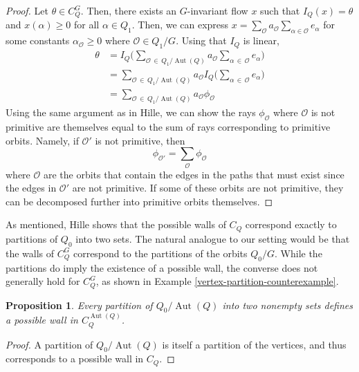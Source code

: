 \documentclass[12pt]{amsart}
\theoremstyle{plain}
\newtheorem{proposition}[theorem]{Proposition}
\theoremstyle{definition}
\DeclareMathOperator{\aut}{Aut}
\begin{document}
\begin{proof}  
    Let $\theta \in C_Q^G$. Then, there exists an $G$-invariant flow $x$ such that $I_Q(x) = \theta$ and $x(\alpha) \geq 0$ for all $\alpha \in Q_1$. Then, we can express $x = \sum_{\mathcal{O}} a_\mathcal{O} \sum_{\alpha \in \mathcal{O}} e_\alpha$ for some constants $\alpha_\mathcal{O} \geq 0$ where $\mathcal{O} \in Q_1/G$. Using that $I_Q$ is linear,
    \begin{align*}
    \theta &= I_Q\Big(\sum_{\mathcal{O} \,\in\, Q_1/\aut(Q)}a_{\mathcal{O}} \sum_{\alpha \,\in\, \mathcal{O}} e_\alpha \Big) \\ 
    &= \sum_{\mathcal{O} \,\in\, Q_1/\aut(Q)}a_{\mathcal{O}} I_Q\Big(\sum_{\alpha \,\in\, \mathcal{O}} e_\alpha \Big) \\
    &= \sum_{\mathcal{O} \,\in\, Q_1/\aut(Q)} a_\mathcal{O}\phi_\mathcal{O}
    \end{align*}
    Using the same argument as in Hille, we can show the rays $\phi_\mathcal{O}$ where $\mathcal{O}$ is not primitive  are themselves equal to the sum of rays corresponding to primitive orbits. Namely, if $\mathcal{O}'$ is not primitive, then
    \[
    \phi_{\mathcal{O}'} = \sum_{\mathcal{O} }\phi_\mathcal{O}
    \]
    where $\mathcal{O}$ are the orbits that contain the edges in the paths that must exist since the edges in $\mathcal{O}'$ are not primitive. If some of these orbits are not primitive, they can be decomposed further into primitive orbits themselves.
\end{proof}

As mentioned, Hille shows that the possible walls of $C_Q$ correspond exactly to partitions of $Q_0$ into two sets. The natural analogue to our setting would be that the walls of $C_Q^G$ correspond to the partitions of the orbits $Q_0/G$. While the partitions do imply the existence of a possible wall, the converse does not generally hold for $C_Q^G$, as shown in Example \ref{vertex-partition-counterexample}.

\begin{proposition} \label{wall-orbit-partition}
    Every partition of $Q_0 / \aut(Q)$ into two nonempty sets defines a possible wall in $C_Q^{\aut(Q)}$.
\end{proposition}

\begin{proof}
    A partition of $Q_0 / \aut(Q)$ is itself a partition of the vertices, and thus corresponds to a possible wall in $C_Q$.
\end{proof}
\end{document}
